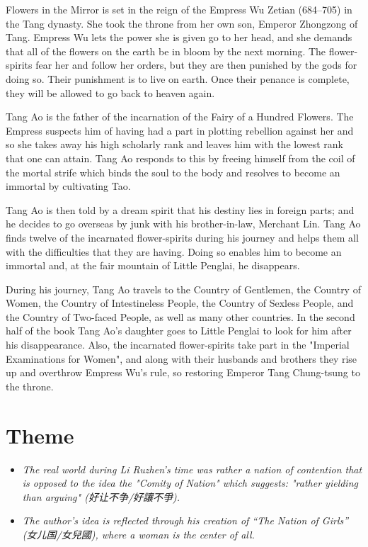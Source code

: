 Flowers in the Mirror is set in the reign of the Empress Wu Zetian
(684--705) in the Tang dynasty. She took the throne from her own son,
Emperor Zhongzong of Tang. Empress Wu lets the power she is given go to
her head, and she demands that all of the flowers on the earth be in
bloom by the next morning. The flower-spirits fear her and follow her
orders, but they are then punished by the gods for doing so. Their
punishment is to live on earth. Once their penance is complete, they
will be allowed to go back to heaven again.

Tang Ao is the father of the incarnation of the Fairy of a Hundred
Flowers. The Empress suspects him of having had a part in plotting
rebellion against her and so she takes away his high scholarly rank and
leaves him with the lowest rank that one can attain. Tang Ao responds to
this by freeing himself from the coil of the mortal strife which binds
the soul to the body and resolves to become an immortal by cultivating
Tao.

Tang Ao is then told by a dream spirit that his destiny lies in foreign
parts; and he decides to go overseas by junk with his brother-in-law,
Merchant Lin. Tang Ao finds twelve of the incarnated flower-spirits
during his journey and helps them all with the difficulties that they
are having. Doing so enables him to become an immortal and, at the fair
mountain of Little Penglai, he disappears.

During his journey, Tang Ao travels to the Country of Gentlemen, the
Country of Women, the Country of Intestineless People, the Country of
Sexless People, and the Country of Two-faced People, as well as many
other countries. In the second half of the book Tang Ao's daughter goes
to Little Penglai to look for him after his disappearance. Also, the
incarnated flower-spirits take part in the "Imperial Examinations for
Women", and along with their husbands and brothers they rise up and
overthrow Empress Wu's rule, so restoring Emperor Tang Chung-tsung to
the throne.

\section{Theme}\label{theme}

\begin{itemize}
\item
  \emph{The real world during Li Ruzhen's time was rather a nation of
  contention that is opposed to the idea the "Comity of Nation" which
  suggests: "rather yielding than arguing" (好让不争/好讓不爭).}
\item
  \emph{The author's idea is reflected through his creation of ``The
  Nation of Girls'' (女儿国/女兒國), where a woman is the center of
  all.}
\end{itemize}

